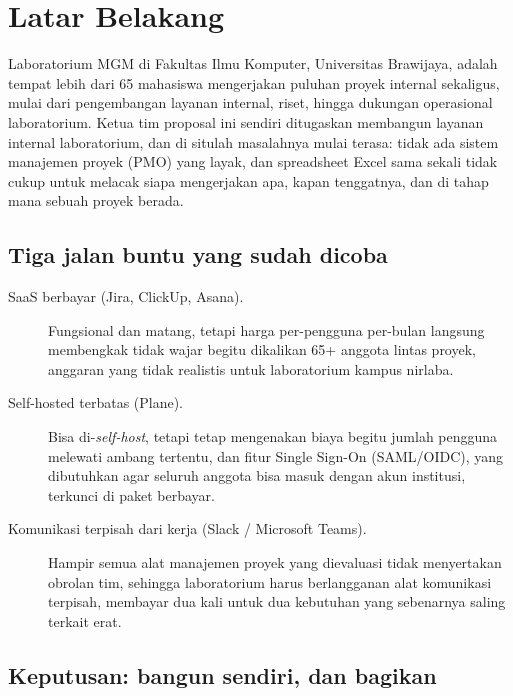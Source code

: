 \section{Latar Belakang}

Laboratorium MGM di Fakultas Ilmu Komputer, Universitas Brawijaya, adalah tempat lebih dari 65 mahasiswa mengerjakan puluhan proyek internal sekaligus, mulai dari pengembangan layanan internal, riset, hingga dukungan operasional laboratorium. Ketua tim proposal ini sendiri ditugaskan membangun layanan internal laboratorium, dan di situlah masalahnya mulai terasa: tidak ada sistem manajemen proyek (PMO) yang layak, dan spreadsheet Excel sama sekali tidak cukup untuk melacak siapa mengerjakan apa, kapan tenggatnya, dan di tahap mana sebuah proyek berada.

\subsection{Tiga jalan buntu yang sudah dicoba}

\begin{description}
\item[SaaS berbayar (Jira, ClickUp, Asana).] Fungsional dan matang, tetapi harga per-pengguna per-bulan langsung membengkak tidak wajar begitu dikalikan 65+ anggota lintas proyek, anggaran yang tidak realistis untuk laboratorium kampus nirlaba.
\item[Self-hosted terbatas (Plane).] Bisa di-\textit{self-host}, tetapi tetap mengenakan biaya begitu jumlah pengguna melewati ambang tertentu, dan fitur Single Sign-On (SAML/OIDC), yang dibutuhkan agar seluruh anggota bisa masuk dengan akun institusi, terkunci di paket berbayar.
\item[Komunikasi terpisah dari kerja (Slack / Microsoft Teams).] Hampir semua alat manajemen proyek yang dievaluasi tidak menyertakan obrolan tim, sehingga laboratorium harus berlangganan alat komunikasi terpisah, membayar dua kali untuk dua kebutuhan yang sebenarnya saling terkait erat.
\end{description}

\subsection{Keputusan: bangun sendiri, dan bagikan}


